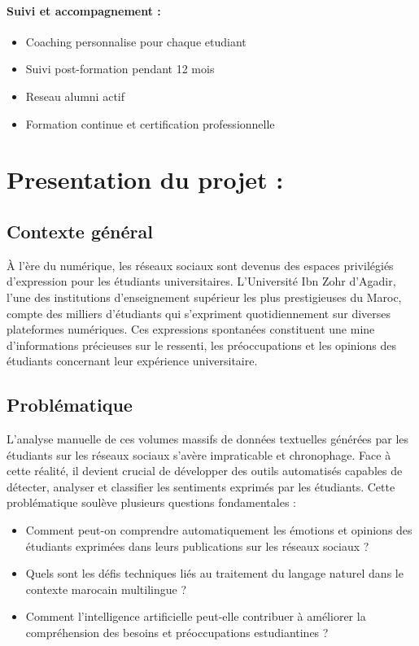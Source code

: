 \paragraph{Suivi et accompagnement :}
\begin{itemize}
    \item Coaching personnalise pour chaque etudiant
    \item Suivi post-formation pendant 12 mois
    \item Reseau alumni actif
    \item Formation continue et certification professionnelle
\end{itemize}

\section{Presentation du projet :}

\subsection{Contexte général}

À l'ère du numérique, les réseaux sociaux sont devenus des espaces privilégiés d'expression pour les étudiants universitaires. L'Université Ibn Zohr d'Agadir, l'une des institutions d'enseignement supérieur les plus prestigieuses du Maroc, compte des milliers d'étudiants qui s'expriment quotidiennement sur diverses plateformes numériques. Ces expressions spontanées constituent une mine d'informations précieuses sur le ressenti, les préoccupations et les opinions des étudiants concernant leur expérience universitaire.

\subsection{Problématique}

L'analyse manuelle de ces volumes massifs de données textuelles générées par les étudiants sur les réseaux sociaux s'avère impraticable et chronophage. Face à cette réalité, il devient crucial de développer des outils automatisés capables de détecter, analyser et classifier les sentiments exprimés par les étudiants. Cette problématique soulève plusieurs questions fondamentales :

\begin{itemize}
    \item Comment peut-on comprendre automatiquement les émotions et opinions des étudiants exprimées dans leurs publications sur les réseaux sociaux ?
    \item Quels sont les défis techniques liés au traitement du langage naturel dans le contexte marocain multilingue ?
    \item Comment l'intelligence artificielle peut-elle contribuer à améliorer la compréhension des besoins et préoccupations estudiantines ?
\end{itemize}

